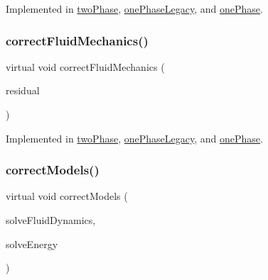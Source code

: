 Implemented in \hyperlink{classFoam_1_1thermalHydraulicsModels_1_1twoPhase_ad7a94cfeb7bfe17f10cb2a3782e1e896}{two\+Phase}, \hyperlink{classFoam_1_1thermalHydraulicsModels_1_1onePhaseLegacy_ad7a94cfeb7bfe17f10cb2a3782e1e896}{one\+Phase\+Legacy}, and \hyperlink{classFoam_1_1thermalHydraulicsModels_1_1onePhase_ad7a94cfeb7bfe17f10cb2a3782e1e896}{one\+Phase}.

\mbox{\label{classFoam_1_1thermalHydraulicsModel_a60d8bd40453510161df9861a9f5e626d}} 
\subsubsection{\texorpdfstring{correct\+Fluid\+Mechanics()}{correctFluidMechanics()}}
{\footnotesize\ttfamily virtual void correct\+Fluid\+Mechanics (\begin{DoxyParamCaption}\item[{scalar \&}]{residual }\end{DoxyParamCaption})\hspace{0.3cm}{\ttfamily [pure virtual]}}



Implemented in \hyperlink{classFoam_1_1thermalHydraulicsModels_1_1twoPhase_adfb5aa92b87e35ceaf380442a10e1094}{two\+Phase}, \hyperlink{classFoam_1_1thermalHydraulicsModels_1_1onePhaseLegacy_adfb5aa92b87e35ceaf380442a10e1094}{one\+Phase\+Legacy}, and \hyperlink{classFoam_1_1thermalHydraulicsModels_1_1onePhase_adfb5aa92b87e35ceaf380442a10e1094}{one\+Phase}.

\mbox{\label{classFoam_1_1thermalHydraulicsModel_a10766df44bd24954b638c11c32c5bbe1}} 
\subsubsection{\texorpdfstring{correct\+Models()}{correctModels()}}
{\footnotesize\ttfamily virtual void correct\+Models (\begin{DoxyParamCaption}\item[{bool}]{solve\+Fluid\+Dynamics,  }\item[{bool}]{solve\+Energy }\end{DoxyParamCaption})\hspace{0.3cm}{\ttfamily [pure virtual]}}



